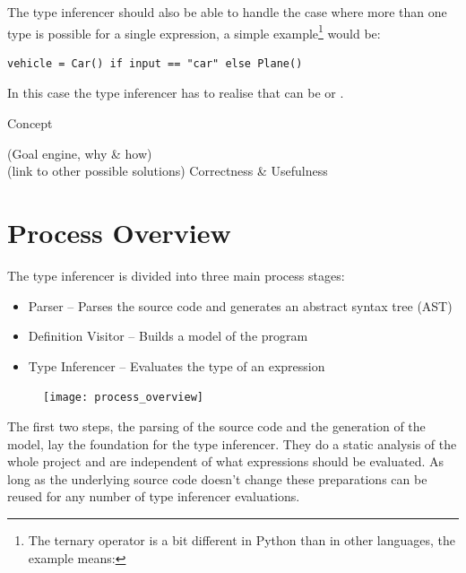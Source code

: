 \documentclass[12pt,halfparskip]{scrreprt}
\begin{document}
The type inferencer should also be able to handle the case where more than one type is possible for a single expression, a simple example\footnote{The ternary operator is a bit different in Python than in other languages, the example means: } would be:

\begin{lstlisting}
vehicle = Car() if input == "car" else Plane()
\end{lstlisting}

In this case the type inferencer has to realise that  can be  or .


{Concept}

(Goal engine, why \& how) \\
(link to other possible solutions)
Correctness \& Usefulness \\

\section{Process Overview}


The type inferencer is divided into three main process stages:

\begin{itemize}
	\item Parser – Parses the source code and generates an abstract syntax tree (AST)
	\item Definition Visitor – Builds a model of the program
	\item Type Inferencer – Evaluates the type of an expression
\end{itemize}

\begin{figure}[h!]
 \centering
 \texttt{[image: process\_overview]}
 \label{fig:process_overview}
\end{figure}



The first two steps, the parsing of the source code and the generation of the model, lay the foundation for the type inferencer. They do a static analysis of the whole project and are independent of what expressions should be evaluated. As long as the underlying source code doesn't change these preparations can be reused for any number of type inferencer evaluations.

\end{document}
